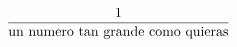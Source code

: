 \documentclass[preview]{standalone}
\begin{document}
\begin{align*}
\frac{1}{\mathrm{un\ numero\ tan\ grande\ \hfill \break como\ quieras}}
\end{align*}
\end{document}
